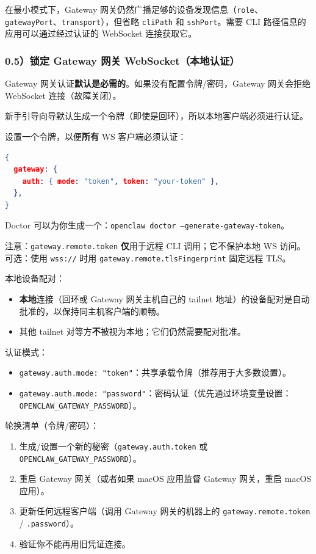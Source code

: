 在最小模式下，Gateway 网关仍然广播足够的设备发现信息（\texttt{role}、\texttt{gatewayPort}、\texttt{transport}），但省略 \texttt{cliPath} 和 \texttt{sshPort}。需要 CLI 路径信息的应用可以通过经过认证的 WebSocket 连接获取它。

\subsubsection{0.5）锁定 Gateway 网关 WebSocket（本地认证）}


Gateway 网关认证\textbf{默认是必需的}。如果没有配置令牌/密码，Gateway 网关会拒绝 WebSocket 连接（故障关闭）。

新手引导向导默认生成一个令牌（即使是回环），所以本地客户端必须进行认证。

设置一个令牌，以便\textbf{所有} WS 客户端必须认证：

\begin{lstlisting}[language=json]
{
  gateway: {
    auth: { mode: "token", token: "your-token" },
  },
}
\end{lstlisting}


Doctor 可以为你生成一个：\texttt{openclaw doctor --generate-gateway-token}。

注意：\texttt{gateway.remote.token} \textbf{仅}用于远程 CLI 调用；它不保护本地 WS 访问。
可选：使用 \texttt{wss://} 时用 \texttt{gateway.remote.tlsFingerprint} 固定远程 TLS。

本地设备配对：

\begin{itemize}
  \item \textbf{本地}连接（回环或 Gateway 网关主机自己的 tailnet 地址）的设备配对是自动批准的，以保持同主机客户端的顺畅。
  \item 其他 tailnet 对等方\textbf{不}被视为本地；它们仍然需要配对批准。
\end{itemize}


认证模式：

\begin{itemize}
  \item \texttt{gateway.auth.mode: "token"}：共享承载令牌（推荐用于大多数设置）。
  \item \texttt{gateway.auth.mode: "password"}：密码认证（优先通过环境变量设置：\texttt{OPENCLAW\_GATEWAY\_PASSWORD}）。
\end{itemize}


轮换清单（令牌/密码）：

\begin{enumerate}
  \item 生成/设置一个新的秘密（\texttt{gateway.auth.token} 或 \texttt{OPENCLAW\_GATEWAY\_PASSWORD}）。
  \item 重启 Gateway 网关（或者如果 macOS 应用监督 Gateway 网关，重启 macOS 应用）。
  \item 更新任何远程客户端（调用 Gateway 网关的机器上的 \texttt{gateway.remote.token} / \texttt{.password}）。
  \item 验证你不能再用旧凭证连接。
\end{enumerate}


